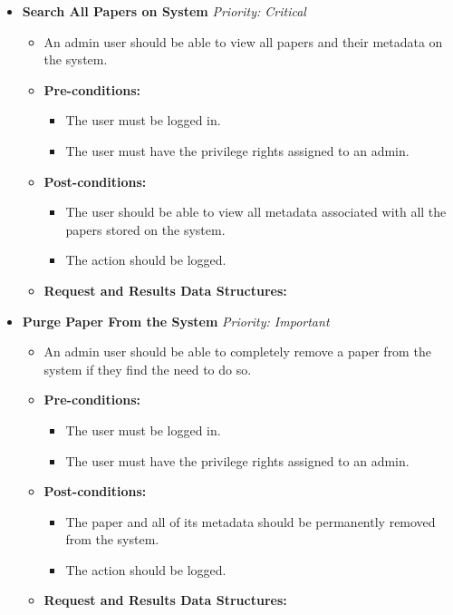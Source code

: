 \documentclass{article}
\begin{document}
				\begin{itemize}
					\item \textbf{Search All Papers on System} \hfill \textit{Priority: Critical}
					\begin{itemize}
						\item An admin user should be able to view all papers and their metadata on the system.
						\item \textbf{Pre-conditions:}
						\begin{itemize}
							\item The user must be logged in.
							\item The user must have the privilege rights assigned to an admin.
						\end{itemize}
						\item \textbf{Post-conditions:}
						\begin{itemize}
							\item The user should be able to view all metadata associated with all the papers stored on the system.
							\item The action should be logged.
						\end{itemize}
						\item \textbf{Request and Results Data Structures:}
					\end{itemize}
					
					\item \textbf{Purge Paper From the System} \hfill \textit{Priority: Important}
					\begin{itemize}
						\item An admin user should be able to completely remove a paper from the system if they find the need to do so.
						\item \textbf{Pre-conditions:}
						\begin{itemize}
							\item The user must be logged in.
							\item The user must have the privilege rights assigned to an admin.
						\end{itemize}
						\item \textbf{Post-conditions:}
						\begin{itemize}
							\item The paper and all of its metadata should be permanently removed from the system.
							\item The action should be logged.
						\end{itemize}
						\item \textbf{Request and Results Data Structures:}
					\end{itemize}
					

\end{itemize}
\end{document}
